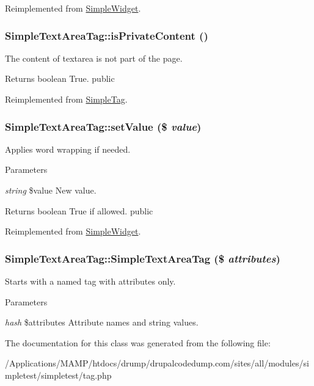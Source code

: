 Reimplemented from \hyperlink{class_simple_widget_a9c0702cdfee1237b1599cb920ce14ba6}{SimpleWidget}.\hypertarget{class_simple_text_area_tag_aef83c24c5a19caeea6447b48f2a3243a}{
\subsubsection[{isPrivateContent}]{\setlength{\rightskip}{0pt plus 5cm}SimpleTextAreaTag::isPrivateContent ()}}
\label{class_simple_text_area_tag_aef83c24c5a19caeea6447b48f2a3243a}
The content of textarea is not part of the page. \begin{DoxyReturn}{Returns}
boolean True.  public 
\end{DoxyReturn}


Reimplemented from \hyperlink{class_simple_tag_a6f1d7a187565b366e995d94da0f16ad4}{SimpleTag}.\hypertarget{class_simple_text_area_tag_a5b56885c1a6c81bd955963843586ad34}{
\subsubsection[{setValue}]{\setlength{\rightskip}{0pt plus 5cm}SimpleTextAreaTag::setValue (\$ {\em value})}}
\label{class_simple_text_area_tag_a5b56885c1a6c81bd955963843586ad34}
Applies word wrapping if needed. 
\begin{DoxyParams}{Parameters}
\item[{\em string}]\$value New value. \end{DoxyParams}
\begin{DoxyReturn}{Returns}
boolean True if allowed.  public 
\end{DoxyReturn}


Reimplemented from \hyperlink{class_simple_widget_a9e048a450e2d29a601e672deda9fa869}{SimpleWidget}.\hypertarget{class_simple_text_area_tag_a022780742c3c3265a938c0809a45661c}{
\subsubsection[{SimpleTextAreaTag}]{\setlength{\rightskip}{0pt plus 5cm}SimpleTextAreaTag::SimpleTextAreaTag (\$ {\em attributes})}}
\label{class_simple_text_area_tag_a022780742c3c3265a938c0809a45661c}
Starts with a named tag with attributes only. 
\begin{DoxyParams}{Parameters}
\item[{\em hash}]\$attributes Attribute names and string values. \end{DoxyParams}


The documentation for this class was generated from the following file:\begin{DoxyCompactItemize}
\item 
/Applications/MAMP/htdocs/drump/drupalcodedump.com/sites/all/modules/simpletest/simpletest/tag.php\end{DoxyCompactItemize}

